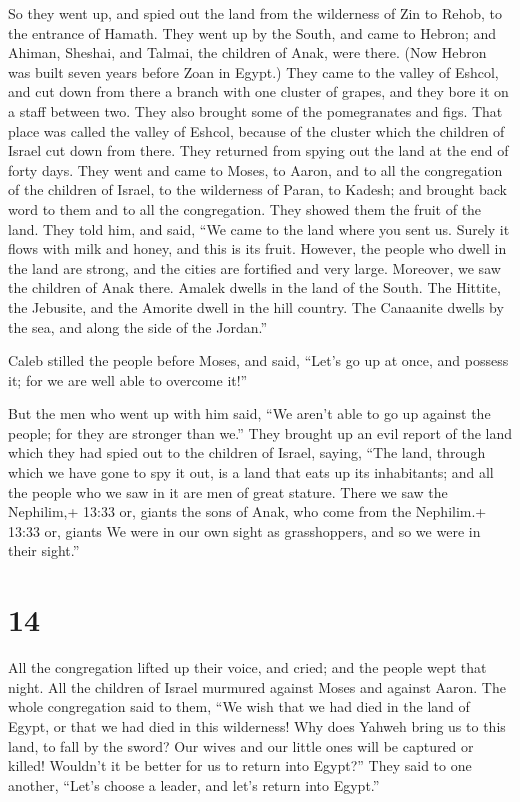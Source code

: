  So they went up, and spied out the land from the
wilderness of Zin to Rehob, to the entrance of Hamath. 
They went up by the South, and came to Hebron; and Ahiman, Sheshai, and
Talmai, the children of Anak, were there. (Now Hebron was built seven
years before Zoan in Egypt.)  They came to the valley of
Eshcol, and cut down from there a branch with one cluster of grapes, and
they bore it on a staff between two. They also brought some of the
pomegranates and figs.  That place was called the valley of
Eshcol, because of the cluster which the children of Israel cut down
from there.  They returned from spying out the land at the
end of forty days.  They went and came to Moses, to Aaron,
and to all the congregation of the children of Israel, to the wilderness
of Paran, to Kadesh; and brought back word to them and to all the
congregation. They showed them the fruit of the land.  They
told him, and said, ``We came to the land where you sent us. Surely it
flows with milk and honey, and this is its fruit.  However,
the people who dwell in the land are strong, and the cities are
fortified and very large. Moreover, we saw the children of Anak there.
 Amalek dwells in the land of the South. The Hittite, the
Jebusite, and the Amorite dwell in the hill country. The Canaanite
dwells by the sea, and along the side of the Jordan.''

 Caleb stilled the people before Moses, and said, ``Let's
go up at once, and possess it; for we are well able to overcome it!''

 But the men who went up with him said, ``We aren't able to
go up against the people; for they are stronger than we.'' 
They brought up an evil report of the land which they had spied out to
the children of Israel, saying, ``The land, through which we have gone
to spy it out, is a land that eats up its inhabitants; and all the
people who we saw in it are men of great stature.  There we
saw the Nephilim,+ 13:33 or, giants the sons of Anak, who come from the
Nephilim.+ 13:33 or, giants We were in our own sight as grasshoppers,
and so we were in their sight.''

\hypertarget{section-13}{%
\section{14}\label{section-13}}

 All the congregation lifted up their voice, and cried; and
the people wept that night.  All the children of Israel
murmured against Moses and against Aaron. The whole congregation said to
them, ``We wish that we had died in the land of Egypt, or that we had
died in this wilderness!  Why does Yahweh bring us to this
land, to fall by the sword? Our wives and our little ones will be
captured or killed! Wouldn't it be better for us to return into Egypt?''
 They said to one another, ``Let's choose a leader, and
let's return into Egypt.''

